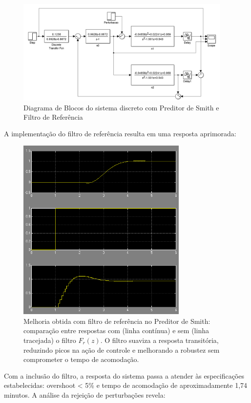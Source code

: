 \documentclass[a4paper,12pt]{article}
\begin{document}
 \begin{figure}[H]
  \centering
  \includegraphics[width=0.95\textwidth]{Imagens/q11p.png}
  \caption{Diagrama de Blocos do sistema discreto com Preditor de Smith e Filtro de Referência}
  \end{figure}

A implementação do filtro de referência resulta em uma resposta aprimorada:

   \begin{figure}[H]
  \centering
  \includegraphics[width=0.75\textwidth]{Imagens/q13.png}
  \caption{Melhoria obtida com filtro de referência no Preditor de Smith: comparação entre respostas com (linha contínua) e sem (linha tracejada) o filtro $F_r(z)$. O filtro suaviza a resposta transitória, reduzindo picos na ação de controle e melhorando a robustez sem comprometer o tempo de acomodação.}
  \end{figure}

Com a inclusão do filtro, a resposta do sistema passa a atender às especificações estabelecidas: overshoot < 5\% e tempo de acomodação de aproximadamente 1,74 minutos. A análise da rejeição de perturbações revela:
\end{document}
